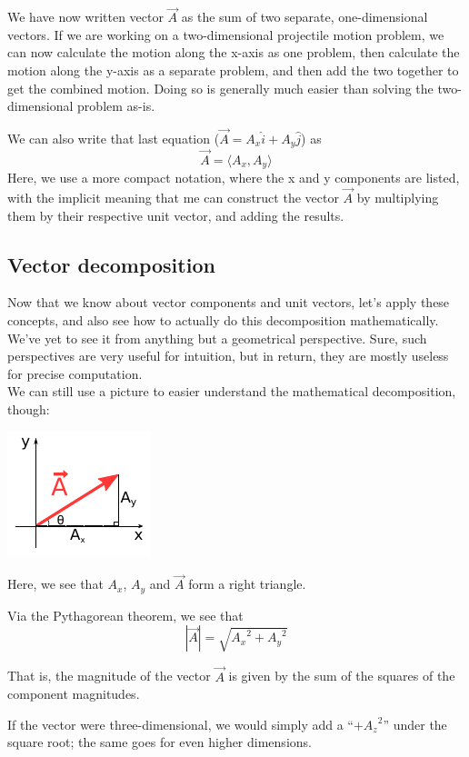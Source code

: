 \documentclass[12pt,a4paper]{report}
\begin{document}
We have now written vector $\vec{A}$ as the sum of two separate, one-dimensional vectors. If we are working on a two-dimensional projectile motion problem, we can now calculate the motion along the x-axis as one problem, then calculate the motion along the y-axis as a separate problem, and then add the two together to get the combined motion. Doing so is generally much easier than solving the two-dimensional problem as-is.

We can also write that last equation ($\vec{A} = A_x \hat{i} + A_y \hat{j}$) as
\[ \vec{A} = \langle A_x, A_y \rangle \]
Here, we use a more compact notation, where the x and y components are listed, with the implicit meaning that me can construct the vector $\vec{A}$ by multiplying them by their respective unit vector, and adding the results.


\subsection{Vector decomposition}
Now that we know about vector components and unit vectors, let's apply these concepts, and also see how to actually do this decomposition mathematically. We've yet to see it from anything but a geometrical perspective. Sure, such perspectives are very useful for intuition, but in return, they are mostly useless for precise computation.\\
We can still use a picture to easier understand the mathematical decomposition, though:

\includegraphics[scale=2]{Graphics/vectors/vectordecomp_trig}

Here, we see that $A_x$, $A_y$ and $\vec{A}$ form a right triangle.

Via the Pythagorean theorem, we see that
\[ |\vec{A}| = \sqrt{{A_x}^2 + {A_y}^2} \]

That is, the magnitude of the vector $\vec{A}$ is given by the sum of the squares of the component magnitudes.

If the vector were three-dimensional, we would simply add a ``$+ {A_z}^2$'' under the square root; the same goes for even higher dimensions.
\end{document}
